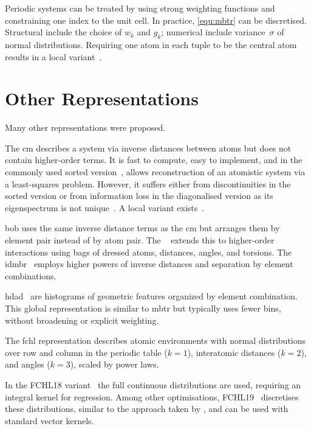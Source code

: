 Periodic systems can be treated by using strong weighting functions and constraining one index to the unit cell.
In practice, \cref{equ:mbtr} can be discretised.
Structural \hps include the choice of $w_k$ and $g_k$; numerical \hps include variance~$\sigma$ of normal distributions.
Requiring one atom in each tuple to be the central atom results in a local variant~\cite{localmbtr2019}.

\section{Other Representations}


Many other representations were proposed.

The \gls{cm} \cite{rtml2012Aq} describes a system via inverse distances between atoms but does not contain higher-order terms.
It is fast to compute, easy to implement, and in the commonly used sorted version~\cite{rtml2012Aq}, allows reconstruction of an atomistic system via a least-squares problem.
However, it suffers either from discontinuities in the sorted version or from information loss in the diagonalised version as its eigenspectrum is not unique~\cite{m2012Aq,rtml2012Bq}.
A local variant exists~\cite{bbhm2017q}.

\Gls{bob} \cite{hbmt2015q} uses the same inverse distance terms as the \gls{cm} but arranges them by element pair instead of by atom pair.
The ~\cite{hl2016q} extends this to higher-order interactions using bags of dressed atoms, distances, angles, and torsions.
The \gls{idmbr}~\cite{ptm2018q} employs higher powers of inverse distances and separation by element combinations.

\Gls{hdad}~\cite{fhrl2017q} are histograms of geometric features organized by element combination.
This global representation is similar to \gls{mbtr} but typically uses fewer bins, without broadening or explicit weighting. %

The \gls{fchl} representation \cite{fchl2018q,cbfl2020q} describes atomic environments with normal distributions over  row and column in the periodic table ($k{=}1$), interatomic distances ($k{=}2$), and angles ($k{=}3$), scaled by power laws.

In the FCHL18 variant~\cite{fchl2018q} the full continuous distributions are used, requiring an integral kernel for regression.
Among other optimisations, FCHL19~\cite{cbfl2020q} discretises these distributions, 
similar to the approach taken by \sfs, and can be used with standard vector kernels.

